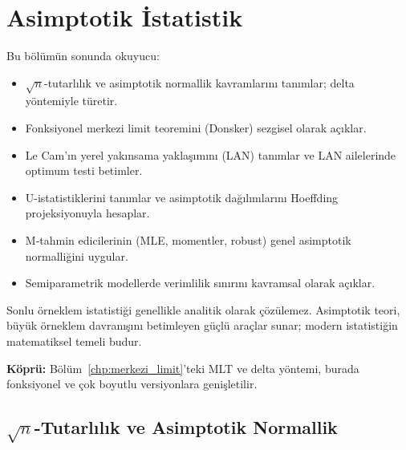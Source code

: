 \chapter{Asimptotik İstatistik}
\label{chp:asimptotik}


\begin{kazanimlar}
Bu bölümün sonunda okuyucu:
\begin{itemize}
  \item $\sqrt{n}$-tutarlılık ve asimptotik normallik kavramlarını tanımlar; delta yöntemiyle türetir.
  \item Fonksiyonel merkezi limit teoremini (Donsker) sezgisel olarak açıklar.
  \item Le Cam'ın yerel yakınsama yaklaşımını (LAN) tanımlar ve LAN ailelerinde optimum testi betimler.
  \item U-istatistiklerini tanımlar ve asimptotik dağılımlarını Hoeffding projeksiyonuyla hesaplar.
  \item M-tahmin edicilerinin (MLE, momentler, robust) genel asimptotik normalliğini uygular.
  \item Semiparametrik modellerde verimlilik sınırını kavramsal olarak açıklar.
\end{itemize}
\end{kazanimlar}

\begin{motivasyon}
Sonlu örneklem istatistiği genellikle analitik olarak çözülemez. Asimptotik teori, büyük örneklem davranışını betimleyen güçlü araçlar sunar; modern istatistiğin matematiksel temeli budur.

\medskip
\noindent\textbf{Köprü:} Bölüm~\ref{chp:merkezi_limit}'teki MLT ve delta yöntemi, burada fonksiyonel ve çok boyutlu versiyonlara genişletilir.
\end{motivasyon}

\section{$\sqrt{n}$-Tutarlılık ve Asimptotik Normallik}
\label{sec:asimptotik_normallik}

